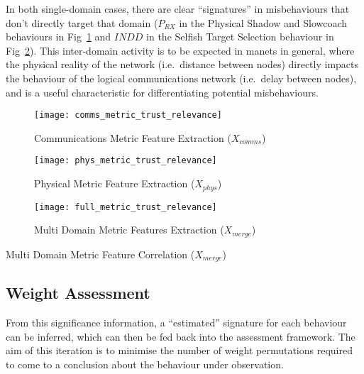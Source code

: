 In both single-domain cases, there are clear ``signatures'' in misbehaviours that don't directly target that domain ($P_{RX}$ in the Physical Shadow and Slowcoach behaviours in Fig~\ref{fig:comms_feature_extraction} and $INDD$ in the Selfish Target Selection behaviour in Fig~\ref{fig:phys_feature_extraction}).
This inter-domain activity is to be expected in \glspl{manet} in general, where the physical reality of the network (i.e.\ distance between nodes) directly impacts the behaviour of the logical communications network (i.e.\ delay between nodes), and is a useful characteristic for differentiating potential misbehaviours.



\begin{figure}[h!]
  \centering
  \texttt{[image: comms\_metric\_trust\_relevance]}
  \caption{Communications Metric Feature Extraction ($X_{comms}$)}
  \label{fig:comms_feature_extraction}
\end{figure}

\begin{figure}[h!]
  \centering
  \texttt{[image: phys\_metric\_trust\_relevance]}
  \caption{Physical Metric Feature Extraction ($X_{phys}$)}
  \label{fig:phys_feature_extraction}
\end{figure}

\begin{figure}[h!]
  \centering
  \texttt{[image: full\_metric\_trust\_relevance]}
  \caption{Multi Domain  Metric Features Extraction ($X_{merge}$)}
  \label{fig:multi_feature_extraction}
\end{figure}

\begin{table}
  \centering
  \caption{Multi Domain Metric Feature Correlation ($X_{merge}$)}
  
  \label{tab:full_metric_correlations}
\end{table}



\subsection{Weight Assessment}\label{sec:weight_assessment}

From this significance information, a ``estimated'' signature for each behaviour can be inferred, which can then be fed back into the assessment framework. 
The aim of this iteration is to minimise the number of weight permutations required to come to a conclusion about the behaviour under observation. 

